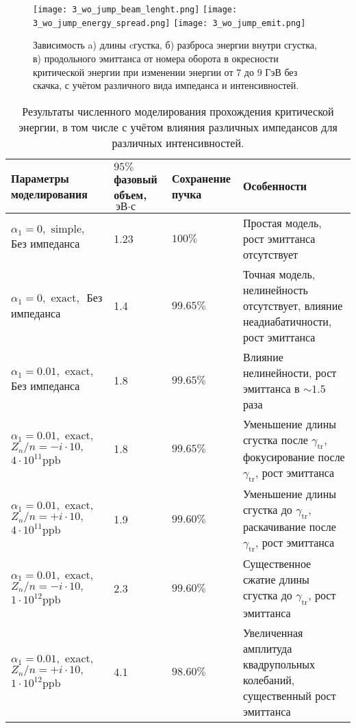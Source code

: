 \begin{figure} [h!]
   \texttt{[image: 3\_wo\_jump\_beam\_lenght.png]}
   \texttt{[image: 3\_wo\_jump\_energy\_spread.png]}
   \texttt{[image: 3\_wo\_jump\_emit.png]}
   \caption{Зависимость a) длины cгустка, б) разброса энергии внутри сгустка, в) продольного эмиттанса от номера оборота в окресности критической энергии при изменении энергии от $7$ до $9$ ГэВ без скачка, с учётом различного вида импеданса и интенсивностей.}
   \label{fig:3_wo_jump}
\end{figure}

\begin{table}\label{tbl:u-70_crossing}
\begin{center}
\caption{Результаты численного моделирования прохождения критической энергии, в том числе с учётом влияния различных импедансов для различных интенсивностей.}
\begin{tabular}{| m{4cm} | M{2.5cm} | M{2.5cm} | m{6.6cm} |}
\hline 
Параметры моделирования & $95 \%$ фазовый объем, $\text{эВ}\cdot\text{с}$ & Сохранение пучка & Особенности \\
\hline
$\alpha_1=0, \text { simple, }$ Без импеданса & 1.23 & $100\%$ & Простая модель, рост эмиттанса отсутствует \\
\hline 
$\alpha_1=0, \text { exact, }$ Без импеданса & 1.4 & $99.65\%$ & Точная модель, нелинейность отсутствует, влияние неадиабатичности, рост эмиттанса \\
\hline 
$\alpha_1=0.01, \text { exact, }$ Без импеданса & 1.8 & $99.65\%$ & Влияние нелинейности, рост эмиттанса в $\sim 1.5$ раза \\
\hline 
$
 \alpha_1=0.01, \text { exact, }$
$ Z_n / n=-i \cdot 10, \quad$
$4 \cdot 10^{11} \mathrm{ppb} $
 & 1.8 & $99.65\%$ & Уменьшение длины сгустка после $\gamma_{\mathrm{tr}}$, фокусирование после $\gamma_{\mathrm{tr}}$, рост эмиттанса \\
\hline 
$
\alpha_1=0.01, \text { exact, }$ 
$ Z_n / n=+i \cdot 10, \quad$
$4 \cdot 10^{11} \mathrm{ppb} $
 & 1.9 & $99.60\%$ & Уменьшение длины сгустка до $\gamma_{\mathrm{tr}}$, раскачивание после $\gamma_{\mathrm{tr}}$, рост эмиттанса \\
\hline 
$
\alpha_1=0.01, \text { exact, } $ 
$Z_n / n=-i \cdot 10, \quad$
$1 \cdot 10^{12} \mathrm{ppb}$
 & 2.3 & $99.60\%$ & Существенное сжатие длины сгустка до $\gamma_{\mathrm{tr}}$, рост эмиттанса \\
\hline 
$
 \alpha_1=0.01, \text { exact, } $ 
$ Z_n / n=+i \cdot 10, \quad$
$ 1 \cdot 10^{12} \mathrm{ppb}$
 & 4.1 & $98.60\%$ & Увеличенная амплитуда квадрупольных колебаний, существенный рост эмиттанса \\
\hline
\end{tabular}
\end{center}
\end{table}


